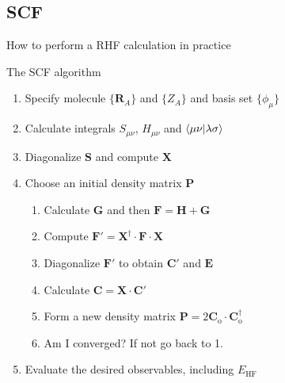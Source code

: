\documentclass[aspectratio=169,9pt]{beamer}
\newcommand{\EHF}{E_\text{HF}}
\newcommand{\bR}{\boldsymbol{R}}
\newcommand{\bC}{\boldsymbol{C}}
\newcommand{\bE}{\boldsymbol{E}}
\newcommand{\bG}{\boldsymbol{G}}
\newcommand{\bP}{\boldsymbol{P}}
\newcommand{\bS}{\boldsymbol{S}}
\newcommand{\bF}{\boldsymbol{F}}
\newcommand{\bH}{\boldsymbol{H}}
\newcommand{\bX}{\boldsymbol{X}}
\begin{document}
\subsection{SCF}
\begin{frame}{How to perform a RHF calculation in practice}
	\begin{block}{The SCF algorithm}
		\begin{enumerate}
			\item \alert{Specify molecule} $\{\bR_A\}$ and $\{Z_A\}$ and \alert{basis set} $\{\phi_\mu\}$ 
			\item Calculate integrals $S_{\mu \nu}$, $H_{\mu \nu}$ and $\braket{ \mu \nu }{ \lambda \sigma }$
			\item Diagonalize $\bS$ and compute $\bX$
			\item Choose an \alert{initial density matrix} $\bP$
			\begin{enumerate}
				\item[1.] Calculate $\bG$ and then $\bF = \bH + \bG$
				\item[2.] Compute $\bF' = \bX^\dag \cdot \bF \cdot \bX$
				\item[3.] Diagonalize $\bF'$ to obtain $\bC'$ and $\bE$
				\item[4.] Calculate $\bC= \bX \cdot  \bC'$
				\item[5.] Form a \alert{new density matrix} $\bP = 2 \bC_{\text{o}} \cdot \bC_{\text{o}}^\dag$
				\item[6.] \alert{Am I converged?} If not go back to 1.
			\end{enumerate}
			\item Evaluate the desired observables, including $\EHF$
		\end{enumerate}
	\end{block}
\end{frame}
\end{document}
